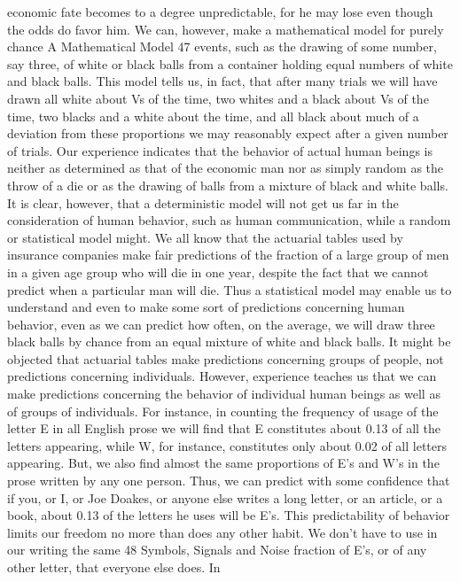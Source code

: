 economic fate becomes to a degree unpredictable, for he may lose
even though the odds do favor him.
We can, however, make a mathematical model for purely chance
A Mathematical Model 47
events, such as the drawing of some number, say three, of white
or black balls from a container holding equal numbers of white
and black balls. This model tells us, in fact, that after many trials
we will have drawn all white about Vs of the time, two whites and
a black about Vs of the time, two blacks and a white about %
the time, and all black about %
much of a deviation from these proportions we may reasonably
expect after a given number of trials.
Our experience indicates that the behavior of actual human
beings is neither as determined as that of the economic man nor
as simply random as the throw of a die or as the drawing of balls
from a mixture of black and white balls. It is clear, however, that
a deterministic model will not get us far in the consideration of
human behavior, such as human communication, while a random
or statistical model might.
We all know that the actuarial tables used by insurance companies
make fair predictions of the fraction of a large group of men
in a given age group who will die in one year, despite the fact that
we cannot predict when a particular man will die. Thus a statistical
model may enable us to understand and even to make some sort
of predictions concerning human behavior, even as we can predict
how often, on the average, we will draw three black balls by chance
from an equal mixture of white and black balls.
It might be objected that actuarial tables make predictions concerning
groups of people, not predictions concerning individuals.
However, experience teaches us that we can make predictions
concerning the behavior of individual human beings as well as of
groups of individuals. For instance, in counting the frequency of
usage of the letter E in all English prose we will find that E constitutes
about 0.13 of all the letters appearing, while W, for instance,
constitutes only about 0.02 of all letters appearing. But, we also
find almost the same proportions of E’s and W’s in the prose
written by any one person. Thus, we can predict with some confidence
that if you, or I, or Joe Doakes, or anyone else writes a long
letter, or an article, or a book, about 0.13 of the letters he uses will
be E’s.
This predictability of behavior limits our freedom no more than
does any other habit. We don’t have to use in our writing the same
48
Symbols, Signals and Noise
fraction of E’s, or of any other letter, that everyone else does. In
